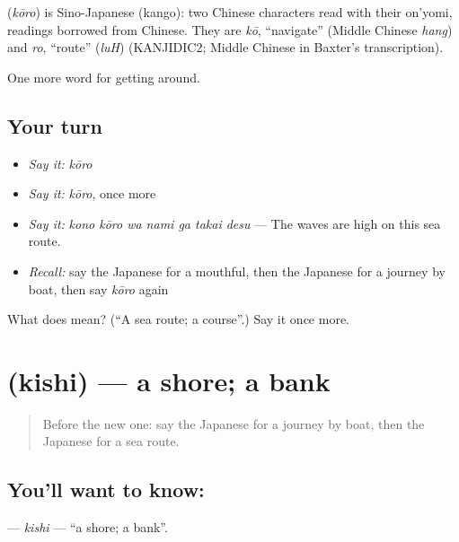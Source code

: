 \begin{cousinweb}
\textbf{} (\emph{kōro}) is Sino-Japanese (kango): two Chinese characters read with their on'yomi, readings borrowed from Chinese. They are \emph{kō}, \textquotedblleft{}navigate\textquotedblright{} (Middle Chinese \emph{hang}) and \emph{ro}, \textquotedblleft{}route\textquotedblright{} (\emph{luH}) (KANJIDIC2; Middle Chinese in Baxter's transcription).
\end{cousinweb}

\begin{grammarlens}[title={What you've built}]
One more word for getting around.
\end{grammarlens}

\subsection*{Your turn}
\begin{itemize}
\raggedright
  \item \emph{Say it:} \emph{kōro}
  \item \emph{Say it:} \emph{kōro}, once more
  \item \emph{Say it:} \emph{kono kōro wa nami ga takai desu} — The waves are high on this sea route.
  \item \emph{Recall:} say the Japanese for a mouthful, then the Japanese for a journey by boat, then say \emph{kōro} again
\end{itemize}

\begin{tcolorbox}[breakable,colback=teal!4,colframe=teal!35!black,title={Before you move on}]
What does  mean? (\textquotedblleft{}A sea route; a course\textquotedblright{}.) Say it once more.
\end{tcolorbox}
\section[\texorpdfstring{\ja{きし} (kishi)}{きし (kishi)}]{ (kishi) — a shore; a bank}

\label{lesson:JA-C381-kishi}



\begin{quote}
Before the new one: say the Japanese for a journey by boat, then the Japanese for a sea route.
\end{quote}

\subsection*{You'll want to know: }
\textbf{} — \emph{kishi} — \textquotedblleft{}a shore; a bank\textquotedblright{}.

